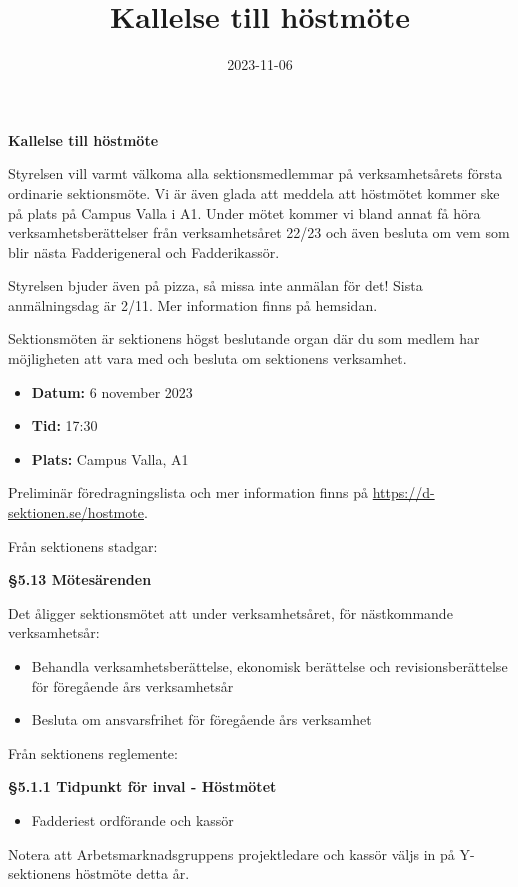 \documentclass{datateknologsektionen-document}
\title{Kallelse till höstmöte}
\date{2023-11-06}
\begin{document}





\large
\begin{center}
  \vspace*{5mm}
  {\LARGE\bfseries Kallelse till höstmöte}
  \vspace{2mm}
\end{center}

Styrelsen vill varmt välkoma alla sektionsmedlemmar på verksamhetsårets första ordinarie sektionsmöte. Vi är även glada att meddela att höstmötet kommer ske på plats på Campus Valla i A1. Under mötet kommer vi bland annat få höra verksamhetsberättelser från verksamhetsåret 22/23 och även besluta om vem som blir nästa Fadderigeneral och Fadderikassör. 

Styrelsen bjuder även på pizza, så missa inte anmälan för det! Sista anmälningsdag är 2/11. Mer information finns på hemsidan.

Sektionsmöten är sektionens högst beslutande organ där du som medlem har möjligheten att vara med och besluta om sektionens verksamhet. 

\vspace*{4mm}
\begin{itemize}
  \item \textbf{Datum:} 6 november 2023
  \item \textbf{Tid:} 17:30
  \item \textbf{Plats:} Campus Valla, A1
  \vspace*{4mm}
\end{itemize}

Preliminär föredragningslista och mer information finns på \url{https://d-sektionen.se/hostmote}.


Från sektionens stadgar:

\textbf{§5.13 Mötesärenden}

Det åligger sektionsmötet att under verksamhetsåret, för nästkommande verksamhetsår:
\begin{itemize}
  \item Behandla verksamhetsberättelse, ekonomisk berättelse och revisionsberättelse för föregående års verksamhetsår
  \item Besluta om ansvarsfrihet för föregående års verksamhet
\end{itemize}

Från sektionens reglemente:

\textbf{§5.1.1 Tidpunkt för inval - Höstmötet}
\begin{itemize}
  \item Fadderiest ordförande och kassör
\end{itemize}
Notera att Arbetsmarknadsgruppens projektledare och kassör väljs in på Y-sektionens höstmöte detta år.
\end{document}
